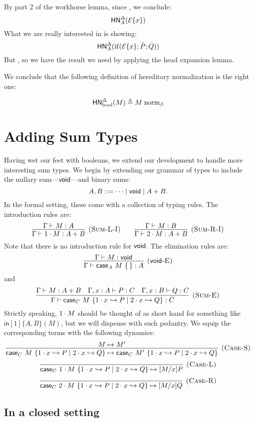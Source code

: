 \documentclass{article}
\begin{document}
By part 2 of the workhorse lemma, since \bnorm{\E}, we conclude:
\[
 \mathsf{HN}^{\Delta}_{A}(\mathcal{E} \{ x \})\\
\]
What we are really interested in is showing:
\[
 \mathsf{HN}^{\Delta}_{A}(\mathrm{if}(\mathcal{E} \{ x \}; \hat P; \hat Q)) \\
\]
But , so we have the result we need by applying the head expansion lemma.

We conclude that the following definition of hereditary normalization is the right one:

\[
\mathsf{HN}^{\Delta}_{\text{bool}}(M) \triangleq M \mathrel{\text{norm}_\beta}
\]

\section{Adding Sum Types}

Having wet our feet with booleans, we extend our development to handle more interesting sum types.
We begin by extending our grammar of types to include the nullary sum---$\mathsf{void}$---and binary sums:
\[
  A, B ::= \dotsb \mid \mathsf{void} \mid A + B.
\]
In the formal setting, these come with a collection of typing rules.
The introduction rules are:
\[
  \infer[\rn{Sum-L-I}]{
    \hasEF{\Gamma}{\inl M}{A + B}
  }{
    \hasEF{\Gamma}{M}{A}
  }
  \qquad
  \infer[\rn{Sum-R-I}]{
    \hasEF{\Gamma}{\inr M}{A + B}
  }{
    \hasEF{\Gamma}{M}{B}
  }
\]
Note that there is no introduction rule for $\mathsf{void}$.
The elimination rules are:
\[
  \infer[\rn{\void-E}]{
    \hasEF{\Gamma}{\vcase{A}{M}}{A}
  }{
    \hasEF{\Gamma}{M}{\void}
  }
\]
and
\[
  \infer[\rn{Sum-E}]{
    \hasEF{\Gamma}{\scase{C}{M}{x}{P}{Q}}{C}
  }{
    \hasEF{\Gamma}{M}{A+B}
    &
    \hasEF{\Gamma,x:A}{P}{C}
    &
    \hasEF{\Gamma,x:B}{Q}{C}
  }
\]
Strictly speaking, $1\cdot M$ should be thought of as short hand for something like $\mathsf{in}[1]\{A,B\}(M)$, but we will dispense with such pedantry.
We equip the corresponding terms with the following dynamics:
\[
  \infer[\rn{Case-S}]{
    \step{\scase{C}{M}{x}{P}{Q}}{\scase{C}{M'}{x}{P}{Q}}
  }{
    \step{M}{M'}
  }
\]
\[
  \infer[\rn{Case-L}]{
    \step{\scase{C}{\inl M}{x}{P}{Q}}{\subst{M}{x}{P}}
  }{}
\]
\[
  \infer[\rn{Case-R}]{
    \step{\scase{C}{\inr M}{x}{P}{Q}}{\subst{M}{x}{Q}}
  }{}
\]

\subsection{In a closed setting}
\end{document}
